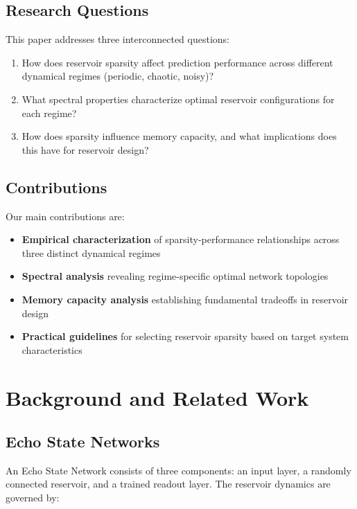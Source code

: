 \documentclass[11pt,a4paper]{article}
\begin{document}
\subsection{Research Questions}

This paper addresses three interconnected questions:

\begin{enumerate}
    \item How does reservoir sparsity affect prediction performance across different dynamical regimes (periodic, chaotic, noisy)?
    \item What spectral properties characterize optimal reservoir configurations for each regime?
    \item How does sparsity influence memory capacity, and what implications does this have for reservoir design?
\end{enumerate}

\subsection{Contributions}

Our main contributions are:

\begin{itemize}
    \item \textbf{Empirical characterization} of sparsity-performance relationships across three distinct dynamical regimes
    \item \textbf{Spectral analysis} revealing regime-specific optimal network topologies
    \item \textbf{Memory capacity analysis} establishing fundamental tradeoffs in reservoir design
    \item \textbf{Practical guidelines} for selecting reservoir sparsity based on target system characteristics
\end{itemize}

\section{Background and Related Work}

\subsection{Echo State Networks}

An Echo State Network consists of three components: an input layer, a randomly connected reservoir, and a trained readout layer. The reservoir dynamics are governed by:
\end{document}

